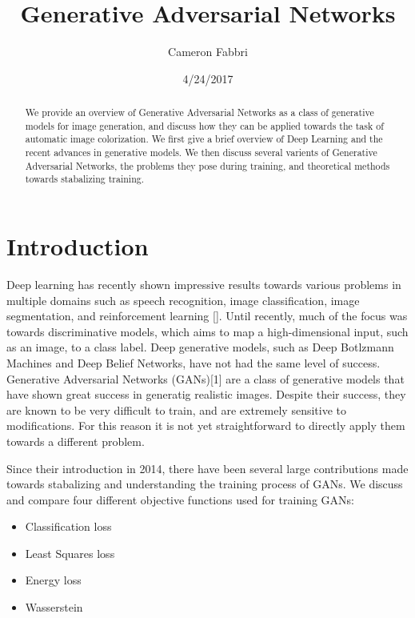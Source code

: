 \documentclass{article}
\begin{document}
\title{Generative Adversarial Networks}

\author{Cameron Fabbri}
\date{4/24/2017}

\maketitle

\begin{abstract}
We provide an overview of Generative Adversarial Networks as a class of generative models for
image generation, and discuss how they can be applied towards the task of automatic image colorization. 
We first give a brief overview of Deep Learning and the recent advances in generative models.
We then discuss several varients of Generative Adversarial Networks, the problems they pose during training,
and theoretical methods towards stabalizing training.
\end{abstract}


\section{Introduction}
Deep learning has recently shown impressive results towards various problems in multiple domains such as speech recognition,
image classification, image segmentation, and reinforcement learning []. Until recently, much of the focus was towards
discriminative models, which aims to map a high-dimensional input, such as an image, to a class label. Deep generative models,
such as Deep Botlzmann Machines and Deep Belief Networks, have not had the same level of success.
Generative Adversarial Networks (GANs)[1] are a class of generative models that have shown great success in generatig realistic
images. Despite their success, they are known to be very difficult to train, and are extremely sensitive to modifications.
For this reason it is not yet straightforward to directly apply them towards a different problem.

Since their introduction in 2014, there have been several large contributions made towards stabalizing and understanding
the training process of GANs. We discuss and compare four different objective functions used for training GANs:

\begin{itemize}
   \item Classification loss
   \item Least Squares loss
   \item Energy loss
   \item Wasserstein
\end{itemize}
\end{document}
